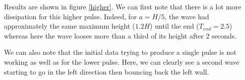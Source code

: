 Results are shown in figure \ref{higher}. We can first note that there is a lot more dissipation for this higher pulse. Indeed, for $a=H/5$, the wave had approximately the same maximum height ($1.2H$) until the end ($T_{end} = 2.5$) whereas here the wave looses more than a third of its height after 2 seconds.

We can also note that the initial data trying to produce a single pulse is not working as well as for the lower pulse. Here, we can clearly see a second wave starting to go in the left direction then bouncing back the left wall.

